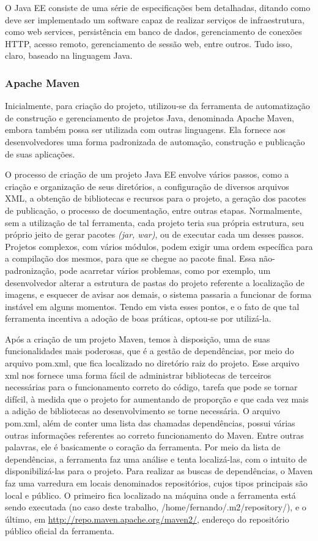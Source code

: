 \documentclass[12pt]{article}
\begin{document}
O Java EE consiste de uma série de especificações bem detalhadas, ditando como deve ser implementado um software capaz de realizar serviços de infraestrutura, como web services, persistência em banco de dados, gerenciamento de conexões HTTP, acesso remoto, gerenciamento de sessão web, entre outros. Tudo isso, claro, baseado na linguagem Java.

\subsubsection{Apache Maven}

Inicialmente, para criação do projeto, utilizou-se da ferramenta de automatização de construção e gerenciamento de projetos Java, denominada Apache Maven, embora também possa ser utilizada com outras linguagens. Ela fornece aos desenvolvedores uma forma padronizada de automação, construção e publicação de suas aplicações.

O processo de criação de um projeto Java EE envolve vários passos, como a criação e organização de seus diretórios, a configuração de diversos arquivos XML, a obtenção de bibliotecas e recursos para o projeto, a geração dos pacotes de publicação, o processo de documentação, entre outras etapas. Normalmente, sem a utilização de tal ferramenta, cada projeto teria sua própria estrutura, seu próprio jeito de gerar pacotes \textit{(jar, war)}, ou de executar cada um desses passos. Projetos complexos, com vários módulos, podem exigir uma ordem específica para a compilação dos mesmos, para que se chegue ao pacote final. Essa não-padronização, pode acarretar vários problemas, como por exemplo, um desenvolvedor alterar a estrutura de pastas do projeto referente a localização de imagens, e esquecer de avisar aos demais, o sistema passaria a funcionar de forma instável em alguns momentos. Tendo em vista esses pontos, e o fato de que tal ferramenta incentiva a adoção de boas práticas, optou-se por utilizá-la.

Após a criação de um projeto Maven, temos à disposição, uma de suas funcionalidades mais poderosas, que é a gestão de dependências, por meio do arquivo pom.xml, que fica localizado no diretório raiz do projeto. Esse arquivo xml nos fornece uma forma fácil de administrar bibliotecas de terceiros necessárias para o funcionamento correto do código, tarefa que pode se tornar difícil, à medida que o projeto for aumentando de proporção e que cada vez mais a adição de bibliotecas ao desenvolvimento se torne necessária. O arquivo pom.xml, além de conter uma lista das chamadas dependências, possui várias outras informações referentes ao correto funcionamento do Maven. Entre outras palavras, ele é basicamente o coração da ferramenta. 
Por meio da lista de dependências, a ferramenta faz uma análise e tenta localizá-las, com o intuito de disponibilizá-las para o projeto. Para realizar as buscas de dependências, o Maven faz uma varredura em locais denominados repositórios, cujos tipos principais são local e público. O primeiro fica localizado na máquina onde a ferramenta está sendo executada (no caso deste trabalho, /home/fernando/.m2/repository/), e o último, em \url{http://repo.maven.apache.org/maven2/}, endereço do repositório público oficial da ferramenta.
\end{document}
